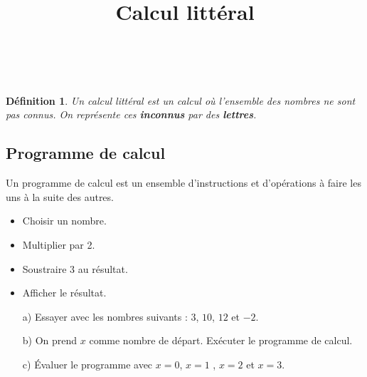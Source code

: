 \documentclass[paper=a4, fontsize=9pt]{scrartcl} %
\title{	
  \vspace{-14ex}
  \horrule{0.5pt} \\[0.4cm] %
  \huge Calcul littéral \\ %
  \horrule{2pt} \\[0.5cm] %
}
\author{}
\date{\vspace{-10ex}} %
\begin{document}

\newtheorem{Definition}{Définition}
\newtheorem{Theorem}{Théorème}
\newtheorem{Proposition}{Propriété}

\renewcommand{\labelitemi}{$\bullet$}
\renewcommand{\labelitemii}{$\circ$}

\maketitle %
\setlength{\columnseprule}{1pt}

\begin{Definition}
  Un calcul littéral est un calcul où l'ensemble des nombres ne sont pas connus. On représente ces \textbf{inconnus} par des \textbf{lettres}.
\end{Definition}

\begin{multicols}{2}

  \section{Programme de calcul}
  Un programme de calcul est un ensemble d'instructions et d'opérations à faire les uns à la suite des autres.

  \begin{itemize}
  \item Choisir un nombre.
  \item Multiplier par 2.
  \item Soustraire 3 au résultat.
  \item Afficher le résultat.
  \end{itemize}

\end{multicols}

\begin{enumerate}
\item[a)] Essayer avec les nombres suivants : $3$, $10$, $12$ et $-2$.
\item[b)] On prend $x$ comme nombre de départ. Exécuter le programme de calcul. 
\item[c)] Évaluer le programme avec $x=0$, $x=1$ , $x=2$ et $x=3$.
\end{enumerate}
\end{document}
